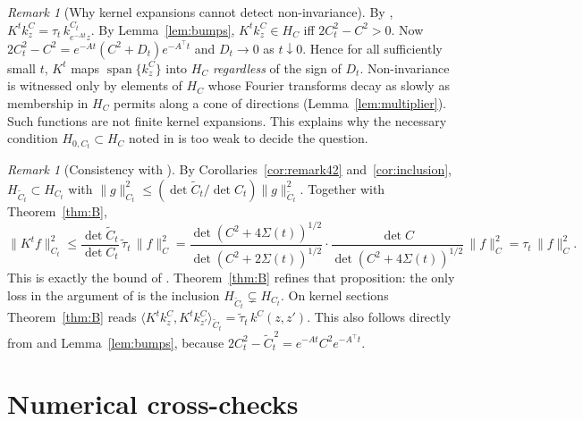\documentclass[11pt]{article}
\theoremstyle{definition}
\theoremstyle{remark}
\newtheorem{remark}[lemma]{Remark}
\newcommand{\Ct}{\widetilde{C}_t}
\newcommand{\taut}{\widetilde{\tau}_t}
\newcommand{\ip}[2]{\langle #1,#2\rangle}
\newcommand{\tp}{\top}
\begin{document}
\begin{remark}[Why kernel expansions cannot detect non-invariance]\label{rem:sections}
By \cite[Proposition~4.1]{PSWPN}, $K^tk^C_z=\tau_t\,k^{C_t}_{e^{-At}z}$. By Lemma~\ref{lem:bumps}, $K^tk^C_z\in H_C$ iff
$2C_t^2-C^2>0$. Now $2C_t^2-C^2=e^{-At}(C^2+D_t)e^{-A^\tp t}$ and $D_t\to0$ as $t\downarrow0$. Hence for all
sufficiently small $t$, $K^t$ maps $\operatorname{span}\{k^C_z\}$ into $H_C$ \emph{regardless} of the sign of $D_t$. Non-invariance is
witnessed only by elements of $H_C$ whose Fourier transforms decay as slowly as membership in $H_C$ permits along
a cone of directions (Lemma~\ref{lem:multiplier}). Such functions are not finite kernel expansions. This explains why
the necessary condition $H_{0,C_t}\subset H_C$ noted in \cite[Remark~4.2]{PSWPN} is too weak to decide the question.
\end{remark}

\begin{remark}[Consistency with {\cite[Proposition~4.1]{PSWPN}}]\label{rem:consistency}
By Corollaries~\ref{cor:remark42} and~\ref{cor:inclusion}, $H_{\Ct}\subset H_{C_t}$ with
$\|g\|_{C_t}^2\le(\det\Ct/\det C_t)\|g\|_{\Ct}^2$. Together with Theorem~\ref{thm:B},
\[
\|K^tf\|_{C_t}^2\le\frac{\det\Ct}{\det C_t}\,\taut\,\|f\|_C^2
=\frac{\det(C^2+4\Sigma(t))^{1/2}}{\det(C^2+2\Sigma(t))^{1/2}}\cdot\frac{\det C}{\det(C^2+4\Sigma(t))^{1/2}}\,\|f\|_C^2=\tau_t\,\|f\|_C^2 .
\]
This is exactly the bound of \cite[Proposition~4.1]{PSWPN}. Theorem~\ref{thm:B} refines that proposition: the only
loss in the argument of \cite{PSWPN} is the inclusion $H_{\Ct}\subsetneq H_{C_t}$. On kernel sections Theorem~\ref{thm:B}
reads $\ip{K^tk^C_z}{K^tk^C_{z'}}_{\Ct}=\taut\,k^C(z,z')$. This also follows directly from
\cite[Proposition~4.1]{PSWPN} and Lemma~\ref{lem:bumps}, because $2C_t^2-\Ct^{\,2}=e^{-At}C^2e^{-A^\tp t}$.
\end{remark}

\section{Numerical cross-checks}\label{sec:numerics}
\end{document}
